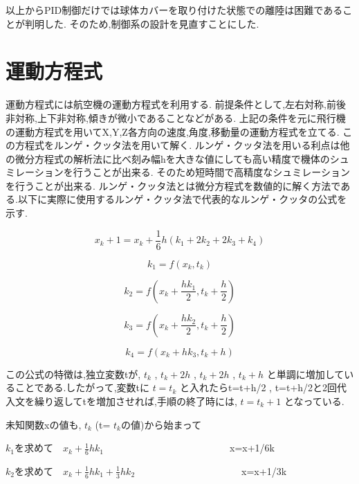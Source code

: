 \documentclass[12pt,oneside]{sotsuken_paper}
\begin{document}
以上からPID制御だけでは球体カバーを取り付けた状態での離陸は困難であることが判明した.
そのため,制御系の設計を見直すことにした.

\section{運動方程式}
運動方程式には航空機の運動方程式を利用する.
前提条件として,左右対称,前後非対称,上下非対称,傾きが微小であることなどがある.
上記の条件を元に飛行機の運動方程式を用いてX,Y,Z各方向の速度,角度,移動量の運動方程式を立てる.
この方程式をルンゲ・クッタ法を用いて解く.
ルンゲ・クッタ法を用いる利点は他の微分方程式の解析法に比べ刻み幅hを大きな値にしても高い精度で機体のシュミレーションを行うことが出来る.
そのため短時間で高精度なシュミレーションを行うことが出来る.
ルンゲ・クッタ法とは微分方程式を数値的に解く方法である.以下に実際に使用するルンゲ・クッタ法で代表的なルンゲ・クッタの公式を示す.

\begin{equation}
	x_k+1 = x_k+\frac{1}{6}h(k_1+2k_2+2k_3+k_4)
	\label{eq1}
\end{equation}

\begin{equation}
	k_1 = f(x_k,t_k)
	\label{eq2}
\end{equation}

\begin{equation}
	k_2 = f(x_k+\frac{hk_1}{2},t_k+\frac{h}{2})
	\label{eq3}
\end{equation}

\begin{equation}
	k_3 = f(x_k+\frac{hk_2}{2},t_k+\frac{h}{2})
	\label{eq4}
\end{equation}

\begin{equation}
	k_4 = f(x_k+hk_3,t_k+h)
	\label{eq5}
\end{equation}

この公式の特徴は,独立変数tが, \(t_k\) , \(t_k+2h\) , \(t_k+2h\) , \(t_k+h\) と単調に増加していることである.したがって,変数tに \(t=t_k\) と入れたらt=t+h/2 , t=t+h/2と2回代入文を繰り返してtを増加させれば,手順の終了時には, \(t=t_k+1\) となっている.


未知関数xの値も, \(t_k\) (t= \(t_k\)の値)から始まって

\(k_1\)を求めて　\(x_k+\frac{1}{6}hk_1\)　　　　　　　　　　　　　x=x+1/6k


\(k_2\)を求めて　\(x_k+\frac{1}{6}hk_1+\frac{1}{3}hk_2\)　　　　　　　　　　　x=x+1/3k
\end{document}
